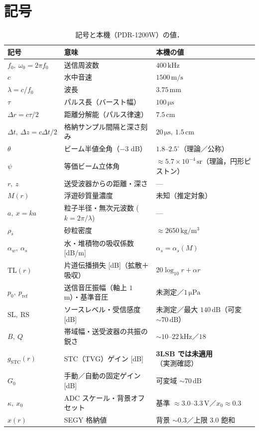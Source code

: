 \documentclass[11pt]{ltjsarticle}
\newcommand{\unit}[1]{\,\mathrm{#1}}
\begin{document}
\section{記号}
\begin{table}[h]
\centering\small
\begin{tabular}{lll}
\toprule
記号 & 意味 & 本機の値 \\
\midrule
$f_0,\ \omega_0=2\pi f_0$ & 送信周波数 & $400\unit{kHz}$ \\
$c$ & 水中音速 & $1500\unit{m/s}$ \\
$\lambda=c/f_0$ & 波長 & $3.75\unit{mm}$ \\
$\tau$ & パルス長（バースト幅） & $100\unit{\mu s}$ \\
$\Delta r=c\tau/2$ & 距離分解能（パルス律速） & $7.5\unit{cm}$ \\
$\Delta t,\ \Delta z=c\Delta t/2$ & 格納サンプル間隔と深さ刻み & $20\unit{\mu s},\ 1.5\unit{cm}$ \\
$\theta$ & ビーム半値全角（$-3$ dB） & $1.8$–$2.5^\circ$（理論／公称） \\
$\psi$ & 等価ビーム立体角 & $\approx5.7\times10^{-4}\unit{sr}$（理論，円形ピストン） \\
$r,\ z$ & 送受波器からの距離・深さ & --- \\
$M(r)$ & 浮遊砂質量濃度 & 未知（推定対象） \\
$a,\ x=ka$ & 粒子半径・無次元波数 ($k=2\pi/\lambda$) & --- \\
$\rho_s$ & 砂粒密度 & $\approx 2650\unit{kg/m^3}$ \\
$\alpha_w,\ \alpha_s$ & 水・堆積物の吸収係数 [dB/m] & $\alpha_s=\alpha_s(M)$ \\
$\mathrm{TL}(r)$ & 片道伝播損失 [dB]（拡散＋吸収） & $20\log_{10}r+\alpha r$ \\
$p_0,\ p_{\mathrm{ref}}$ & 送信音圧振幅（軸上 $1$ m）・基準音圧 & 未測定／$1\unit{\mu Pa}$ \\
$\mathrm{SL},\ \mathrm{RS}$ & ソースレベル・受信感度 [dB] & 未測定／最大 $140\unit{dB}$（可変 $\sim\!70\unit{dB}$） \\
$B,\ Q$ & 帯域幅・送受波器の共振の鋭さ & $\sim\!10$–$22\unit{kHz}$／$18$ \\
$g_{\mathrm{STC}}(r)$ & STC（TVG）ゲイン [dB] & \textbf{3LSB では未適用}（実測確認） \\
$G_0$ & 手動／自動の固定ゲイン [dB] & 可変域 $\sim 70\unit{dB}$ \\
$\kappa,\ x_0$ & ADC スケール・背景オフセット & 基準 $\approx3.0$–$3.3\unit{V}$／$x_0\approx0.3$ \\
$x(r)$ & SEGY 格納値 & 背景 $\sim\!0.3$／上限 $3.0$ 飽和 \\
\bottomrule
\end{tabular}
\caption{記号と本機（PDR-1200W）の値．}
\label{tab:sym}
\end{table}
\end{document}
